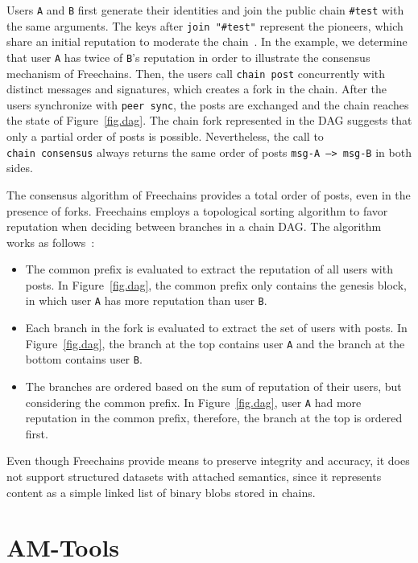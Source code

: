 \documentclass[12pt]{article}
\newcommand{\code}[1]  {\texttt{\footnotesize{#1}}}
\begin{document}
Users \code{A} and \code{B} first generate their identities and join the
public chain \code{\#test} with the same arguments.
The keys after \code{join~"\#test"} represent the pioneers, which share an
initial reputation to moderate the chain~\cite{fcs.sbseg20}.
In the example, we determine that user \code{A} has twice of \code{B}'s
reputation in order to illustrate the consensus mechanism of Freechains.
Then, the users call \code{chain~post} concurrently with distinct messages and
signatures, which creates a fork in the chain.
%
After the users synchronize with \code{peer~sync}, the posts are exchanged and
the chain reaches the state of Figure~\ref{fig.dag}.
The chain fork represented in the DAG suggests that only a partial order of
posts is possible.
Nevertheless, the call to \code{chain~consensus} always returns the same order
of posts \code{msg-A~-->~msg-B} in both sides.

The consensus algorithm of Freechains provides a total order of posts, even in
the presence of forks.
Freechains employs a topological sorting algorithm to favor reputation when
deciding between branches in a chain DAG.
The algorithm works as follows~\cite{fcs.sbseg20}:
\begin{itemize}
\item
    The common prefix is evaluated to extract the reputation of all users with
    posts.
    In Figure~\ref{fig.dag}, the common prefix only contains the genesis
    block, in which user \code{A} has more reputation than user \code{B}.
\item
    Each branch in the fork is evaluated to extract the set of users with
    posts.
    In Figure~\ref{fig.dag}, the branch at the top contains user \code{A} and
    the branch at the bottom contains user \code{B}.
\item
    The branches are ordered based on the sum of reputation of their users, but
    considering the common prefix.
    In Figure~\ref{fig.dag}, user \code{A} had more reputation in the common
    prefix, therefore, the branch at the top is ordered first.
\end{itemize}

Even though Freechains provide means to preserve integrity and accuracy, it
does not support structured datasets with attached semantics, since it
represents content as a simple linked list of binary blobs stored in chains.

\section{AM-Tools}
\label{sec.amtools}
\end{document}
